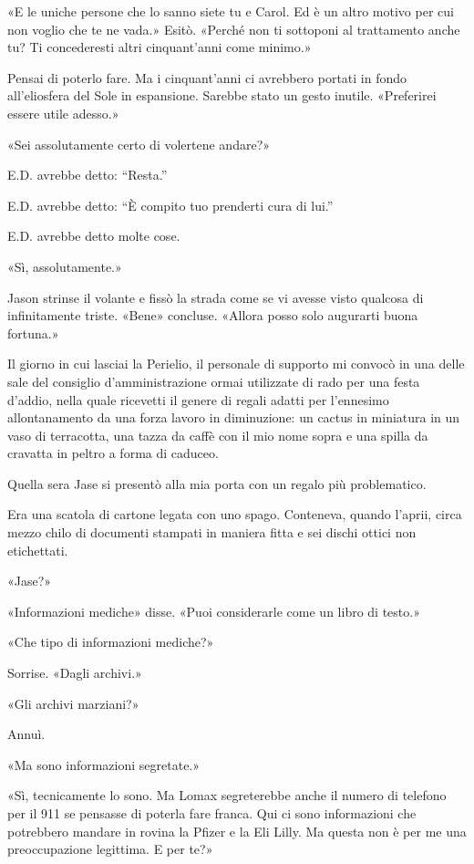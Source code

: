 «E le uniche persone che lo sanno siete tu e Carol. Ed è un altro motivo
per cui non voglio che te ne vada.» Esitò. «Perché non ti sottoponi al
trattamento anche tu? Ti concederesti altri cinquant'anni come minimo.»

Pensai di poterlo fare. Ma i cinquant'anni ci avrebbero portati in fondo
all'eliosfera del Sole in espansione. Sarebbe stato un gesto inutile.
«Preferirei essere utile adesso.»

«Sei assolutamente certo di volertene andare?»

E.D. avrebbe detto: ``Resta.''

E.D. avrebbe detto: ``È compito tuo prenderti cura di lui.''

E.D. avrebbe detto molte cose.

«Sì, assolutamente.»

Jason strinse il volante e fissò la strada come se vi avesse visto
qualcosa di infinitamente triste. «Bene» concluse. «Allora posso solo
augurarti buona fortuna.»

\separatorefiori

Il giorno in cui lasciai la Perielio, il personale di supporto mi
convocò in una delle sale del consiglio d'amministrazione ormai
utilizzate di rado per una festa d'addio, nella quale ricevetti il
genere di regali adatti per l'ennesimo allontanamento da una forza
lavoro in diminuzione: un cactus in miniatura in un vaso di terracotta,
una tazza da caffè con il mio nome sopra e una spilla da cravatta in
peltro a forma di caduceo.

Quella sera Jase si presentò alla mia porta con un regalo più
problematico.

Era una scatola di cartone legata con uno spago. Conteneva, quando
l'aprii, circa mezzo chilo di documenti stampati in maniera fitta e sei
dischi ottici non etichettati.

«Jase?»

«Informazioni mediche» disse. «Puoi considerarle come un libro di
testo.»

«Che tipo di informazioni mediche?»

Sorrise. «Dagli archivi.»

«Gli archivi marziani?»

Annuì.

«Ma sono informazioni segretate.»

«Sì, tecnicamente lo sono. Ma Lomax segreterebbe anche il numero di
telefono per il 911 se pensasse di poterla fare franca. Qui ci sono
informazioni che potrebbero mandare in rovina la Pfizer e la Eli Lilly.
Ma questa non è per me una preoccupazione legittima. E per te?»

